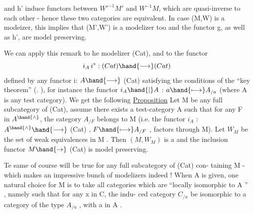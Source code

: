 and h' induce functors between $W'^{-1}M'$ and $W^{-1}M$, which are quasi-inverse
to each other - hence these two categories are equivalent. In case
(M,W) is a modeizer, this implies that (M',W') is a modelizer too and the
 functor g, as well as h', are model preserving.

We can apply this remark to he modelizer (Cat), and to the functor
\[ i_A\, i^{*} : (Cat) \hand{\longrightarrow} (Cat) \]
defined by any functor i: $A\hand{\longrightarrow}$ (Cat) satisfying the conditions of the
``key theorem'' (\hand{\S}. ), for instance the functor $i_A\hand{|}A$ : $a\hand{\longmapsto} A_{/a}$
(where A is any test category). We get the following
\uline{Proposition} Let M be any full subcategory of (Cat), assume there exists
a test-category A such that for any F in $A^{\hand{\wedge}}$, the category $A_{/F}$ belongs to
M (i.e. the functor $i_A$ : $A^{\hand{\wedge}}\hand{\longrightarrow}$ (Cat) , $F\hand{\longmapsto} A_{/F}$ , factors through M). 
Let $W_M$ be the set of weak equivalences in M . Then $(M,W_M)$ is a %
  and the inclusion functor $M\hand{\to}$ (Cat) is model preserving.

Te same of course will be true for any full subcategory of (Cat) con-
taining M - which makes an impressive bunch of modelizers indeed ! When
 A is given, one natural choice for M is to take all categories  which are
``locally isomorphic to A '' , namely such that for any x in C, the indu-
ced category $C_{/x}$ be isomorphic to a category of the type $A_{/a}$ , with a in
A .

